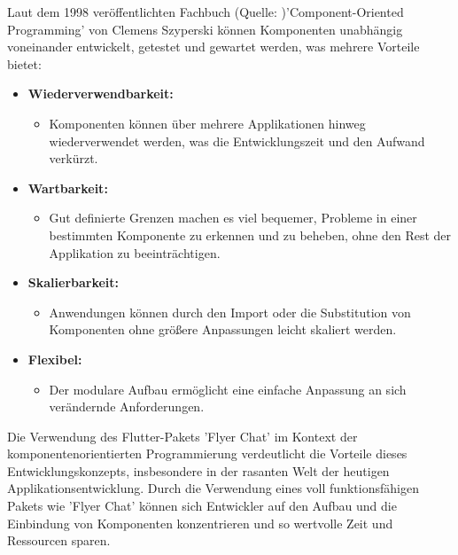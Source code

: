 Laut dem 1998 veröffentlichten Fachbuch (Quelle: \cite{szyperski-component} )'Component-Oriented Programming' von Clemens Szyperski können Komponenten unabhängig voneinander entwickelt, getestet und gewartet werden, was mehrere Vorteile bietet:

\begin{itemize}
  \item \textbf{Wiederverwendbarkeit:}
        \begin{itemize}
          \item {Komponenten können über mehrere Applikationen hinweg wiederverwendet werden, was die Entwicklungszeit und den Aufwand verkürzt.}
        \end{itemize}
  \item \textbf{Wartbarkeit:}
        \begin{itemize}
          \item {Gut definierte Grenzen machen es viel bequemer, Probleme in einer bestimmten Komponente zu erkennen und zu beheben, ohne den Rest der Applikation zu beeinträchtigen.}
        \end{itemize}
  \item \textbf{Skalierbarkeit:}
        \begin{itemize}
          \item {Anwendungen können durch den Import oder die Substitution von Komponenten ohne größere Anpassungen leicht skaliert werden.}
        \end{itemize}
  \item \textbf{Flexibel:}
        \begin{itemize}
          \item {Der modulare Aufbau ermöglicht eine einfache Anpassung an sich verändernde Anforderungen.}
        \end{itemize}
\end{itemize}

Die Verwendung des Flutter-Pakets 'Flyer Chat' im Kontext der komponentenorientierten Programmierung verdeutlicht die Vorteile dieses Entwicklungskonzepts, insbesondere in der rasanten Welt der heutigen Applikationsentwicklung. Durch die Verwendung eines voll funktionsfähigen Pakets wie 'Flyer Chat' können sich Entwickler auf den Aufbau und die Einbindung von Komponenten konzentrieren und so wertvolle Zeit und Ressourcen sparen.

